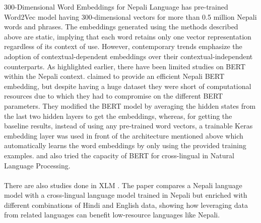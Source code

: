 300-Dimensional Word Embeddings for Nepali Language \cite{300D} has pre-trained Word2Vec model having 300-dimensional vectors for more than 0.5 million Nepali words and phrases.
The embeddings generated using the methods described above are static, implying that each word retains only one vector representation regardless of its context of use. However, contemporary trends emphasize the adoption of contextual-dependent embeddings over their contextual-independent counterparts. As highlighted earlier, there have been limited studies on BERT within the Nepali context. \cite{koirala-niraula-2021-npvec1} claimed to provide an efficient Nepali BERT embedding, but despite having a huge dataset they were short of computational resources due to which they had to compromise on the different BERT parameters. They modified the BERT model by averaging the hidden states from the last two hidden layers to get the embeddings, whereas, for getting the baseline results, instead of using any pre-trained word vectors, a trainable Keras embedding layer was used in front of the architecture mentioned above which automatically learns the word embeddings by only using the provided training examples. \cite{rajan_nepalibert_2021} and  \cite{milanmg_bert-nepali_2022} also tried the capacity of BERT for cross-lingual in Natural Language Processing. \\\\
There are also studies done in XLM \cite{NEURIPS2019_c04c19c2}. The paper compares a Nepali language model with a cross-lingual language model trained in Nepali but enriched with different combinations of Hindi and English data, showing how leveraging data from related languages can benefit low-resource languages like Nepali.

